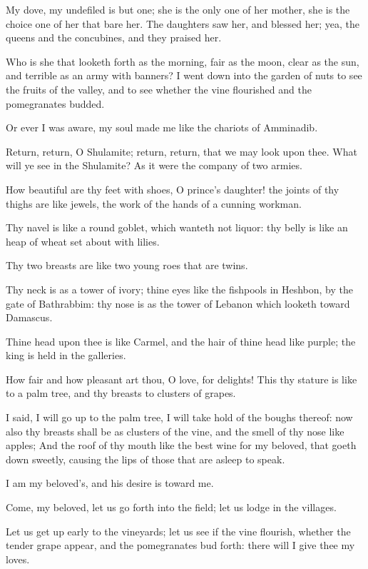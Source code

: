\Verse My dove, my undefiled is but one; she is the only one of her mother, she is the choice one of her that bare her. The daughters saw her, and blessed her; yea, the queens and the concubines, and they praised her.

\Verse Who is she that looketh forth as the morning, fair as the moon, clear as the sun, and terrible as an army with banners?  \Verse I went down into the garden of nuts to see the fruits of the valley, and to see whether the vine flourished and the pomegranates budded.

\Verse Or ever I was aware, my soul made me like the chariots of Amminadib.

\Verse Return, return, O Shulamite; return, return, that we may look upon thee. What will ye see in the Shulamite? As it were the company of two armies.


\Chapter
\Verse How beautiful are thy feet with shoes, O prince's daughter! the joints of thy thighs are like jewels, the work of the hands of a cunning workman.

\Verse Thy navel is like a round goblet, which wanteth not liquor: thy belly is like an heap of wheat set about with lilies.

\Verse Thy two breasts are like two young roes that are twins.

\Verse Thy neck is as a tower of ivory; thine eyes like the fishpools in Heshbon, by the gate of Bathrabbim: thy nose is as the tower of Lebanon which looketh toward Damascus.

\Verse Thine head upon thee is like Carmel, and the hair of thine head like purple; the king is held in the galleries.

\Verse How fair and how pleasant art thou, O love, for delights!  \Verse This thy stature is like to a palm tree, and thy breasts to clusters of grapes.

\Verse I said, I will go up to the palm tree, I will take hold of the boughs thereof: now also thy breasts shall be as clusters of the vine, and the smell of thy nose like apples; \Verse And the roof of thy mouth like the best wine for my beloved, that goeth down sweetly, causing the lips of those that are asleep to speak.

\Verse I am my beloved's, and his desire is toward me.

\Verse Come, my beloved, let us go forth into the field; let us lodge in the villages.

\Verse Let us get up early to the vineyards; let us see if the vine flourish, whether the tender grape appear, and the pomegranates bud forth: there will I give thee my loves.

